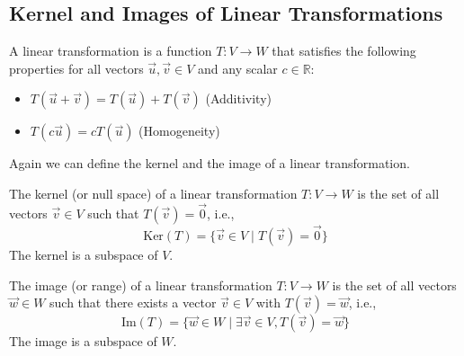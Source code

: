 \subsection{Kernel and Images of Linear Transformations}
\begin{definition}
    A linear transformation is a function $T: V \to W$ that satisfies the following properties for all vectors $\vec{u}, \vec{v} \in V$ and any scalar $c \in \mathbb{R}$:
    \begin{itemize}[itemsep=1pt,label=$\circ$]
        \item $T(\vec{u} + \vec{v}) = T(\vec{u}) + T(\vec{v})$ (Additivity)
        \item $T(c\vec{u}) = cT(\vec{u})$ (Homogeneity)
    \end{itemize}
\end{definition}
Again we can define the kernel and the image of a linear transformation.
\begin{definition}
    The kernel (or null space) of a linear transformation $T: V \to W$ is the set of all vectors $\vec{v} \in V$ such that $T(\vec{v}) = \vec{0}$, i.e.,
    \[ \text{Ker}(T) = \{ \vec{v} \in V \mid T(\vec{v}) = \vec{0} \} \]
    The kernel is a subspace of $V$.
\end{definition}
\begin{definition}
    The image (or range) of a linear transformation $T: V \to W$ is the set of all vectors $\vec{w} \in W$ such that there exists a vector $\vec{v} \in V$ with $T(\vec{v}) = \vec{w}$, i.e.,
    \[ \text{Im}(T) = \{ \vec{w} \in W \mid \exists \vec{v} \in V, T(\vec{v}) = \vec{w} \} \]
    The image is a subspace of $W$.
\end{definition}

